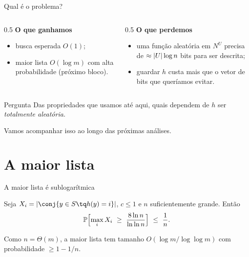 \documentclass[aspectratio=169,11pt]{beamer}
\newcommand{\PP}{\mathbb P}
\begin{document}
\begin{frame}{Qual é o problema?}
  \begin{columns}[T]
    \begin{column}{0.5\textwidth}
      \textbf{O que ganhamos}
      \begin{itemize}
      \item busca esperada $O(1)$;
      \item maior lista $O(\log m)$ com alta probabilidade (próximo bloco).
      \end{itemize}
    \end{column}
    \begin{column}{0.5\textwidth}
      \textbf{O que perdemos}
      \begin{itemize}
      \item uma função aleatória em $N^U$ precisa de $\approx\lvert U\rvert\log n$ bits
        para ser descrita;
      \item guardar $h$ custa mais que o vetor de bits que queríamos evitar.
      \end{itemize}
    \end{column}
  \end{columns}
  \vspace{1.2em}
  \pause
  \begin{block}{Pergunta}
    Das propriedades que usamos até aqui, quais dependem de $h$ ser
    \emph{totalmente aleatória.}
\end{block}
  Vamos acompanhar isso ao longo das próximas análises.
\end{frame}

\section{A maior lista}

\begin{frame}{A maior lista é sublogarítmica}
  \begin{lemma}
    Seja $X_i=\card{\conj{y\in S\tq h(y)=i}}$, $c\le1$ e $n$
    suficientemente grande. Então
    \[
      \PP\Bigl[\max_i X_i\ \ge\ \frac{8\ln n}{\ln\ln n}\Bigr]\ \le\
      \frac1n .
    \]
  \end{lemma}
  Como $n=\Theta(m)$, a maior lista tem tamanho $O(\log m/\log\log m)$
  com probabilidade $\ge1-1/n$.
\end{frame}
\end{document}
